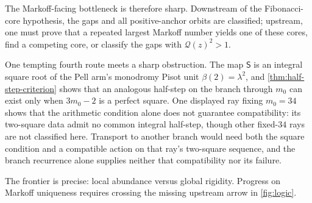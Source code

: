 The Markoff-facing bottleneck is therefore sharp. Downstream of the
Fibonacci-core hypothesis, the gaps and all positive-anchor orbits are
classified; upstream, one must prove that a repeated largest Markoff number
yields one of these cores, find a competing core, or classify the gaps with
$\mathcal Q(z)^2>1$.

One tempting fourth route meets a sharp obstruction. The map $\mathsf S$ is
an integral square root of the Pell arm's monodromy Pisot unit
$\beta(2)=\lambda^2$, and \cref{thm:half-step-criterion} shows that an
analogous half-step on the branch through $m_0$ can exist only when
$3m_0-2$ is a perfect square.
One displayed ray fixing $m_0=34$ shows that the arithmetic condition alone
does not guarantee compatibility: its two-square data admit no common
integral half-step, though other fixed-$34$ rays are not classified here.
Transport to another branch would need both the square condition and a
compatible action on that ray's two-square sequence, and the branch
recurrence alone supplies neither that compatibility nor its failure.

The frontier is precise: local abundance versus global rigidity. Progress on
Markoff uniqueness requires crossing the missing upstream arrow in
\cref{fig:logic}.
